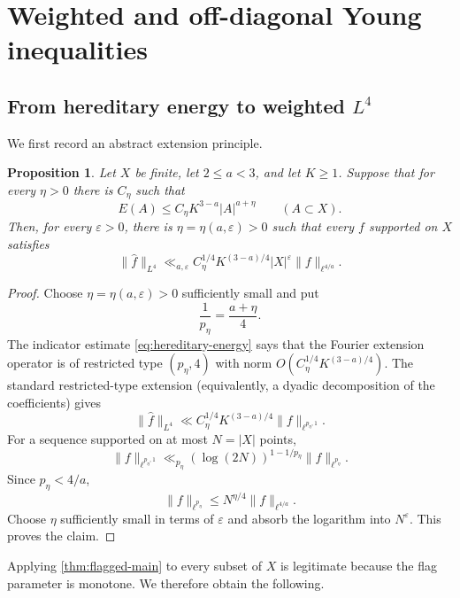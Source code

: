 \documentclass[11pt]{amsart}
\numberwithin{equation}{section}
\newtheorem{proposition}[theorem]{Proposition}
\theoremstyle{definition}
\theoremstyle{remark}
\newcommand{\eps}{\varepsilon}
\newcommand{\1}{\mathbf 1}
\newcommand{\card}[1]{\lvert #1\rvert}
\newcommand{\norm}[2][]{\lVert #2\rVert_{#1}}
\begin{document}
\section{Weighted and off-diagonal Young inequalities}\label{sec:weighted-young}

\subsection{From hereditary energy to weighted \texorpdfstring{$L^4$}{L4}}
We first record an abstract extension principle.

\begin{proposition}\label{prop:restricted-to-strong}
Let $X$ be finite, let $2\leq a<3$, and let $K\geq1$.  Suppose that for every $\eta>0$ there is $C_\eta$ such that
\begin{equation}\label{eq:hereditary-energy}
 E(A)\leq C_\eta K^{3-a}\card A^{a+\eta}
 \qquad(A\subset X).
\end{equation}
Then, for every $\eps>0$, there is $\eta=\eta(a,\eps)>0$ such that every $f$ supported on $X$ satisfies
\begin{equation}\label{eq:weighted-L4}
 \norm[L^4]{\widehat f}
 \ll_{a,\eps} C_\eta^{1/4}K^{(3-a)/4}\card X^\eps
 \norm[\ell^{4/a}]{f}.
\end{equation}
\end{proposition}

\begin{proof}
Choose $\eta=\eta(a,\eps)>0$ sufficiently small and put
\[
 \frac1{p_\eta}=\frac{a+\eta}{4}.
\]
The indicator estimate \eqref{eq:hereditary-energy} says that the Fourier extension operator is of restricted type $(p_\eta,4)$ with norm $O(C_\eta^{1/4}K^{(3-a)/4})$.  The standard restricted-type extension (equivalently, a dyadic decomposition of the coefficients) gives
\begin{equation}\label{eq:lorentz-step}
 \norm[L^4]{\widehat f}
 \ll C_\eta^{1/4}K^{(3-a)/4}\norm[\ell^{p_\eta,1}]{f}.
\end{equation}
For a sequence supported on at most $N=\card X$ points,
\[
 \norm[\ell^{p_\eta,1}]{f}
 \ll_{p_\eta}(\log(2N))^{1-1/p_\eta}\norm[\ell^{p_\eta}]{f}.
\]
Since $p_\eta<4/a$,
\[
 \norm[\ell^{p_\eta}]{f}
 \leq N^{\eta/4}\norm[\ell^{4/a}]{f}.
\]
Choose $\eta$ sufficiently small in terms of $\eps$ and absorb the logarithm into $N^\eps$.  This proves the claim.
\end{proof}

Applying \cref{thm:flagged-main} to every subset of $X$ is legitimate because the flag parameter is monotone.  We therefore obtain the following.
\end{document}
